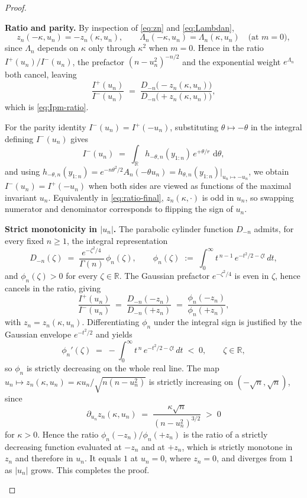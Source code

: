 \documentclass[numsec,webpdf,modern,medium,namedate]{oup-authoring-template}
\theoremstyle{thmstyleone}%
\theoremstyle{thmstyletwo}%
\theoremstyle{thmstylethree}%
\newcommand{\dd}{\,\mathrm{d}}
\newcommand{\1}{\mathbf{1}}
\begin{document}
\begin{proof}
\begin{enumerate}
\textbf{Ratio and parity.} By inspection of \eqref{eq:zn} and \eqref{eq:Lambdan},
\[
  z_n(-\kappa,u_n) = -z_n(\kappa,u_n),
  \qquad
  \Lambda_n(-\kappa,u_n) = \Lambda_n(\kappa,u_n)
  \quad\text{(at $m=0$)},
\]
since $\Lambda_n$ depends on $\kappa$ only through $\kappa^2$ when
$m=0$. Hence in the ratio $I^+(u_n)/I^-(u_n)$, the prefactor
$(n-u_n^2)^{-n/2}$ and the exponential weight $e^{\Lambda_n}$
both cancel, leaving
\begin{equation}\label{eq:ratio-final}
  \frac{I^+(u_n)}{I^-(u_n)}
  \;=\;\frac{D_{-n}\!\bigl(-z_n(\kappa,u_n)\bigr)}
            {D_{-n}\!\bigl(+z_n(\kappa,u_n)\bigr)},
\end{equation}
which is \eqref{eq:Ipm-ratio}.


For the parity identity $I^-(u_n) = I^+(-u_n)$, substituting
$\theta\mapsto-\theta$ in the integral defining $I^-(u_n)$ gives
\[
  I^-(u_n)
  \;=\;\int_\mathbb{R} h_{-\theta,n}(y_{1:n})\,e^{+\theta/r}\,\dd\theta,
\]
and using $h_{-\theta,n}(y_{1:n}) = e^{-n\theta^2/2}A_n(-\theta u_n)
= h_{\theta,n}(y_{1:n})\big|_{u_n\mapsto-u_n}$, we obtain
$I^-(u_n) = I^+(-u_n)$ when both sides are viewed as functions of
the maximal invariant $u_n$. Equivalently in
\eqref{eq:ratio-final}, $z_n(\kappa,\cdot)$ is odd in $u_n$, so
swapping numerator and denominator corresponds to flipping the sign of
$u_n$.

\textbf{Strict monotonicity in $|u_n|$.} The parabolic cylinder function 
$D_{-n}$ admits, for every fixed $n \geq 1$, the integral representation
\[
  D_{-n}(\zeta) \;=\; \frac{e^{-\zeta^{2}/4}}{\Gamma(n)}\, \phi_n(\zeta),
  \qquad
  \phi_n(\zeta) \;:=\; \int_{0}^{\infty} t^{\,n-1}\, e^{-t^{2}/2 - \zeta t}\, dt,
\]
and $\phi_n(\zeta) > 0$ for every $\zeta \in \mathbb{R}$. The Gaussian
prefactor $e^{-\zeta^{2}/4}$ is even in $\zeta$, hence cancels in the ratio, giving
\[
  \frac{I^{+}(u_n)}{I^{-}(u_n)}
  \;=\;
  \frac{D_{-n}(-z_n)}{D_{-n}(+z_n)}
  \;=\;
  \frac{\phi_n(-z_n)}{\phi_n(+z_n)},
\]
with $z_n = z_n(\kappa, u_n)$. Differentiating $\phi_n$ under the integral 
sign is justified by the Gaussian envelope $e^{-t^{2}/2}$ and yields
\[
  \phi_n'(\zeta)
  \;=\;
  -\int_{0}^{\infty} t^{\,n}\, e^{-t^{2}/2 - \zeta t}\, dt
  \;<\; 0,
  \qquad \zeta \in \mathbb{R},
\]
so $\phi_n$ is strictly decreasing on the whole real line. The map 
$u_n \mapsto z_n(\kappa, u_n) = \kappa u_n / \sqrt{n(n - u_n^{2})}$ is 
strictly increasing on $(-\sqrt{n}, \sqrt{n})$, since
\[
  \partial_{u_n} z_n(\kappa, u_n)
  \;=\;
  \frac{\kappa \sqrt{n}}{(n - u_n^{2})^{3/2}}
  \;>\; 0
\]
for $\kappa > 0$. Hence the ratio $\phi_n(-z_n)/\phi_n(+z_n)$ is the ratio 
of a strictly decreasing function evaluated at $-z_n$ and at $+z_n$, 
which is strictly monotone in $z_n$ and therefore in $u_n$. It equals $1$ 
at $u_n = 0$, where $z_n = 0$, and diverges from $1$ as $|u_n|$ grows. 
This completes the proof.



\end{enumerate}
\end{proof}
\end{document}
